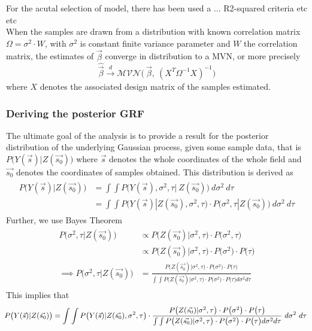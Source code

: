 \documentclass{article}
\begin{document}
For the acutal selection of model, there has been used a ... R2-squared criteria etc etc \\

When the samples are drawn from a distribution with known correlation matrix $\Omega = \sigma^2 \cdot W$, with $\sigma^2$ is constant finite variance parameter and $W$ the correlation matrix, the estimates of $\vec{\beta}$ converge in distribution to a MVN, or more precisely
\begin{equation}
\hat{\vec{\beta}} \xrightarrow[]{d} \mathcal{MVN} \big( \ \vec{\beta}, \ (X^T \Omega^{-1} X)^{-1} \big)
\end{equation}
where $X$ denotes the associated design matrix of the samples estimated.

\subsubsection{Deriving the posterior GRF}
The ultimate goal of the analysis is to provide a result for the posterior distribution of the underlying Gaussian process, given some sample data, that is $P \big( Y(\vec{s}) | Z(\vec{s_0}) \big)$ where $\vec{s}$ denotes the whole coordinates of the whole field and $\vec{s_0}$ denotes the coordinates of samples obtained. This distribution is derived as 
\begin{align*}
\begin{split}
P \big( Y(\vec{s}) | Z(\vec{s_0}) \big) &= \int \int P \big( Y(\vec{s}), \sigma^2, \tau | \ Z(\vec{s_0}) \big) \ d\sigma^2 \ d\tau \\
&= \int \int P \big( Y(\vec{s}) | Z(\vec{s_0}), \sigma^2, \tau \big) \cdot P\big( \sigma^2, \tau | Z(\vec{s_0}) \big) \ d\sigma^2 \ d\tau 
\end{split}
\end{align*}
Further, we use Bayes Theorem 
\begin{align}\label{eq:posterior_prior}
\begin{split}
P\big( \sigma^2, \tau | Z(\vec{s_0}) \big) &\propto P\big( Z(\vec{s_0}) | \sigma^2, \tau \big) \cdot P\big( \sigma^2, \tau \big) \\[5pt]
&\propto P\big( Z(\vec{s_0}) | \sigma^2, \tau \big) \cdot P\big( \sigma^2 \big) \cdot P\big( \tau \big) \\[10pt]
\implies P\big( \sigma^2, \tau | Z(\vec{s_0}) \big) &= \frac{P\big( Z(\vec{s_0}) | \sigma^2, \tau \big) \cdot P\big( \sigma^2 \big) \cdot P\big( \tau \big)}{\int \int P\big( Z(\vec{s_0}) | \sigma^2, \tau \big) \cdot P\big( \sigma^2 \big) \cdot P\big( \tau \big) d\sigma^2 d\tau}
\end{split}
\end{align}
This implies that 
\begin{equation}\label{eq:grf_posterior}
\hspace*{-0.1cm}
P \big( Y(\vec{s}) | Z(\vec{s_0}) \big) = \int \int P \big( Y(\vec{s}) | Z(\vec{s_0}), \sigma^2, \tau \big) \cdot \frac{P\big( Z(\vec{s_0}) | \sigma^2, \tau \big) \cdot P\big( \sigma^2 \big) \cdot P\big( \tau \big)}{\int \int P\big( Z(\vec{s_0}) | \sigma^2, \tau \big) \cdot P\big( \sigma^2 \big) \cdot P\big( \tau \big) d\sigma^2 d\tau} \ d\sigma^2 \ d\tau
\end{equation}
\end{document}
